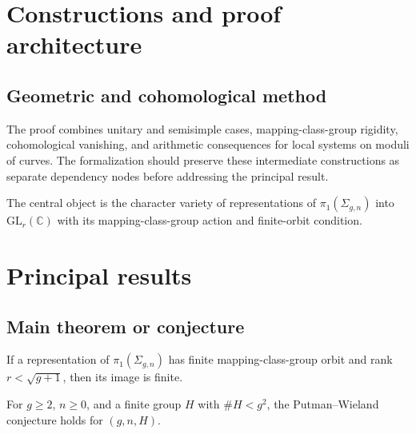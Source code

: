 \chapter{Constructions and proof architecture}
\label{chap:canonical-representations-surface-groups-method}

\section{Geometric and cohomological method}
\label{sec:canonical-representations-surface-groups-method}

The proof combines unitary and semisimple cases, mapping-class-group rigidity, cohomological vanishing, and arithmetic consequences for local systems on moduli of curves. The formalization should preserve these intermediate constructions
as separate dependency nodes before addressing the principal result.

\begin{definition}
\label{canonical-representations-surface-groups-central-object}
The central object is the character variety of representations of $\pi_1(\Sigma_{g,n})$ into $\mathrm{GL}_r(\mathbb C)$ with its mapping-class-group action and finite-orbit condition.
\notready
\end{definition}

\chapter{Principal results}
\label{chap:canonical-representations-surface-groups-results}

\section{Main theorem or conjecture}
\label{sec:canonical-representations-surface-groups-results}

\begin{theorem}
\label{canonical-representations-surface-groups-main}
If a representation of $\pi_1(\Sigma_{g,n})$ has finite mapping-class-group orbit and rank $r<\sqrt{g+1}$, then its image is finite.
\notready
\end{theorem}

\begin{theorem}
\label{canonical-representations-surface-groups-secondary}
For $g\geq2$, $n\geq0$, and a finite group $H$ with $\#H<g^2$, the Putman--Wieland conjecture holds for $(g,n,H)$.
\notready
\end{theorem}
